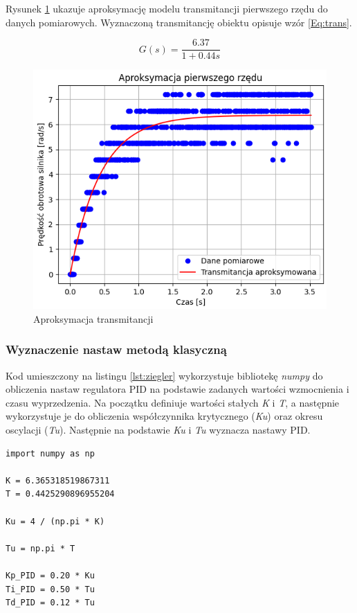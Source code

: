 \documentclass[12pt,twoside]{article}
\begin{document}
Rysunek \ref{Fig:aprox} ukazuje aproksymację modelu transmitancji pierwszego rzędu do danych pomiarowych. Wyznaczoną transmitancję obiektu opisuje wzór \ref{Eq:trans}.

\begin{equation}
G(s) = \frac{6.37}{1 + 0.44s}
\label{Eq:trans}
\end{equation}

\begin{figure}[ht]%
 \centering%
 \includegraphics[width=12cm]{figures/PID/aprox.png}%
 \caption{Aproksymacja transmitancji}%
 \label{Fig:aprox}%
\end{figure}

\newpage

\subsubsection{Wyznaczenie nastaw metodą klasyczną}

Kod umieszczony na listingu \ref{lst:ziegler} wykorzystuje bibliotekę \textit{numpy} do obliczenia nastaw regulatora PID na podstawie zadanych wartości wzmocnienia i czasu wyprzedzenia. Na początku definiuje wartości stałych \textit{K} i \textit{T}, a następnie wykorzystuje je do obliczenia współczynnika krytycznego (\textit{Ku}) oraz okresu oscylacji (\textit{Tu}). Następnie na podstawie \textit{Ku} i \textit{Tu} wyznacza nastawy PID.

\begin{lstlisting}[caption={Kod z obliczeniami i wyświetleniem wyników}, label={lst:ziegler}]
import numpy as np

K = 6.365318519867311
T = 0.4425290896955204

Ku = 4 / (np.pi * K)

Tu = np.pi * T

Kp_PID = 0.20 * Ku
Ti_PID = 0.50 * Tu
Td_PID = 0.12 * Tu
\end{lstlisting}
\end{document}
